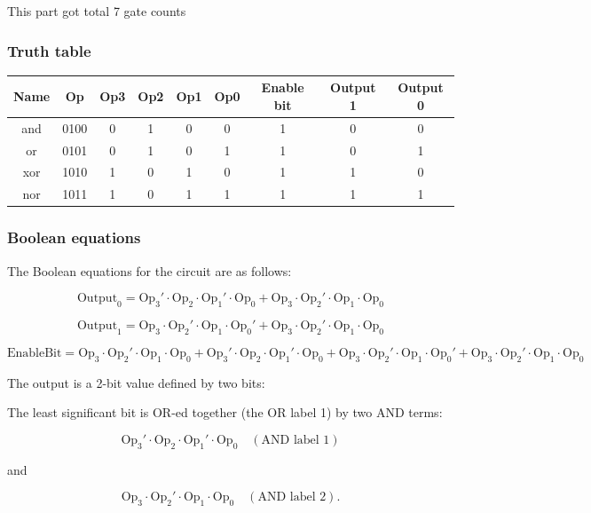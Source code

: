 \documentclass{article}
\begin{document}
\hspace{2em} This part got total 7 gate counts

\subsubsection{Truth table}
\begin{table}[H]
\centering
\begin{tabular}{|c|c|c|c|c|c|c|c|c|}
\hline
Name & Op & Op3 & Op2 & Op1 & Op0 & Enable bit & Output 1 & Output 0 \\ \hline
and & 0100 & 0 & 1 & 0 & 0 & 1 & 0 & 0 \\ \hline
or & 0101 & 0 & 1 & 0 & 1 & 1 & 0 & 1 \\ \hline
xor & 1010 & 1 & 0 & 1 & 0 & 1 & 1 & 0 \\ \hline
nor & 1011 & 1 & 0 & 1 & 1 & 1 & 1 & 1 \\ \hline
\end{tabular}
\end{table}

\subsubsection{Boolean equations}
The Boolean equations for the circuit are as follows:

\[
\text{Output}_0 = \text{Op}_3' \cdot \text{Op}_2 \cdot \text{Op}_1' \cdot \text{Op}_0 + \text{Op}_3 \cdot \text{Op}_2' \cdot \text{Op}_1 \cdot \text{Op}_0
\]

\[
\text{Output}_1 = \text{Op}_3 \cdot \text{Op}_2' \cdot \text{Op}_1 \cdot \text{Op}_0' + \text{Op}_3 \cdot \text{Op}_2' \cdot \text{Op}_1 \cdot \text{Op}_0
\]

\[
\text{EnableBit} = \text{Op}_3 \cdot \text{Op}_2' \cdot \text{Op}_1 \cdot \text{Op}_0 + \text{Op}_3' \cdot \text{Op}_2 \cdot \text{Op}_1' \cdot \text{Op}_0 + \text{Op}_3 \cdot \text{Op}_2' \cdot \text{Op}_1 \cdot \text{Op}_0' + \text{Op}_3 \cdot \text{Op}_2' \cdot \text{Op}_1 \cdot \text{Op}_0
\]

The output is a 2-bit value defined by two bits:

The least significant bit is OR-ed together (the OR label 1) by two AND terms:

\[
\text{Op}_3' \cdot \text{Op}_2 \cdot \text{Op}_1' \cdot \text{Op}_0 \quad (\text{AND label 1})
\]

and

\[
\text{Op}_3 \cdot \text{Op}_2' \cdot \text{Op}_1 \cdot \text{Op}_0 \quad (\text{AND label 2}).
\]
\end{document}
